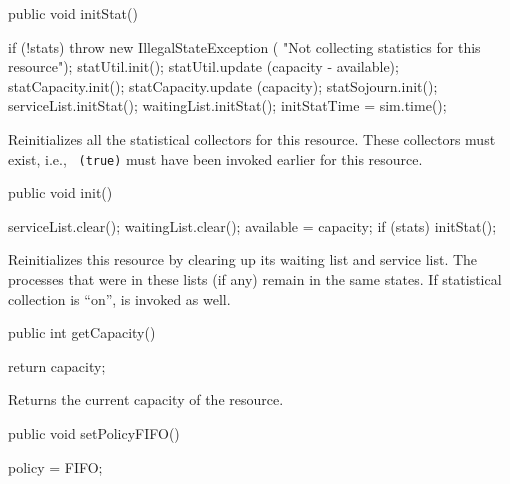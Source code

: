 \begin{code}

   public void initStat() \begin{hide} {
        if (!stats)  throw new IllegalStateException (
                               "Not collecting statistics for this resource");
        statUtil.init();
        statUtil.update (capacity - available);
        statCapacity.init();
        statCapacity.update (capacity);
        statSojourn.init();
        serviceList.initStat();
        waitingList.initStat();
        initStatTime = sim.time();
   }\end{hide}
\end{code}
\begin{tabb}  Reinitializes all the statistical collectors for this 
   resource.  These collectors must exist, i.e., 
   ~\texttt{(true)} must have been invoked earlier for 
   this resource.
\end{tabb}
\begin{code}

   public void init() \begin{hide} {
      serviceList.clear();
      waitingList.clear();
      available = capacity;
      if (stats) initStat();
   }\end{hide}
\end{code}
\begin{tabb}  Reinitializes this resource by clearing up its waiting list
   and service list.  The processes that were in these lists (if any)
   remain in the same states.   If statistical collection is ``on'',
    is invoked as well.
\end{tabb}
\begin{code}

   public int getCapacity() \begin{hide} {
      return capacity;
   }\end{hide}
\end{code}
\begin{tabb}  Returns the current capacity of the resource.
\end{tabb}
\begin{htmlonly}
\end{htmlonly}
\begin{code}

   public void setPolicyFIFO()\begin{hide} {
      policy = FIFO;
   }\end{hide}
\end{code}
